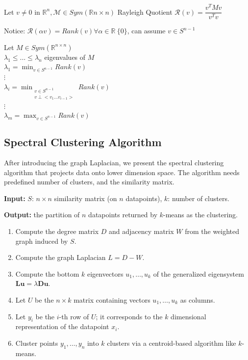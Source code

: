 {	\begin{definition}
		Let $v \neq 0 $ in $\mathbb R^n, \mathcal M \in Sym(\mathbb R{n \times n})$
		Rayleigh Quotient
		$\mathcal R(v) = \dfrac{v^T M v}{v^Tv}$
		
		Notice: $\mathcal R(\alpha v) = Rank(v) \forall \alpha \in \mathbb R \ \{0\}$, can assume $v \in S^{n-1}$
	\end{definition}
	
	
	\begin{theorem}
		Let $M \in Sym(\mathbb R^{n\times n})$\\
		$\lambda_1 \leq ... \leq \lambda_n$ eigenvalues of $M$ \\
		$\lambda_1 = \min_{v \in S^{n-1}} Rank (v)$\\
		$\vdots$ \\
		$\lambda_i = \min_{\substack{ v \in S^{n-1}\\
				v \perp < v_1 ... v_{i-1} >}} Rank (v)$ \\
		$\vdots$ \\
		$\lambda_m = \max_{v \in S^{n-1}} Rank (v)$
	\end{theorem}
	
	\subsection{Spectral Clustering Algorithm}
	
	After introducing the graph Laplacian, we present the spectral clustering algorithm that projects data onto lower dimension space. The algorithm needs predefined number of clusters, and the similarity matrix.
	
	\textbf{Input:} $S$: $n\times n$ similarity matrix (on $n$ datapoints), $k$: number of clusters.
	
	\textbf{Output:} the partition of $n$ datapoints returned by $k$-means as the clustering.
	
	\begin{enumerate}
		\item Compute the degree matrix $D$ and adjacency matrix $W$ from the weighted graph induced by $S$.
		\item Compute the graph Laplacian $L = D - W$.
		\item Compute the bottom $k$ eigenvectors $u_1,\ldots,u_k$ of the generalized eigensystem $\mathbf{Lu} = \lambda \mathbf{Du}$.
		\item Let $U$ be the $n \times k$ matrix containing vectors $u_1,\ldots,u_k$ as columns.
		\item Let $y_i$ be the $i$-th row of $U$; it corresponds to the $k$ dimensional representation of the datapoint $x_i$.
		\item Cluster points $y_1,\ldots,y_n$ into $k$ clusters via a centroid-based algorithm like $k$-means.
	\end{enumerate}
	
}
